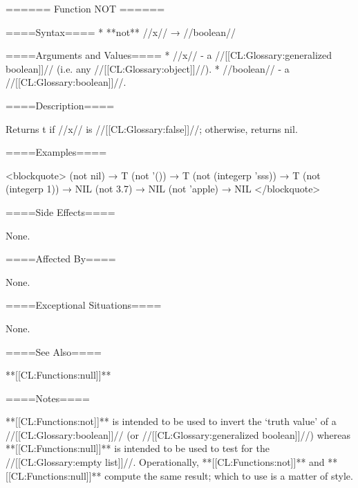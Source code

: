 ====== Function NOT ======

====Syntax====
  * **not** //x// → //boolean//

====Arguments and Values====
  * //x// - a //[[CL:Glossary:generalized boolean]]// (i.e. any //[[CL:Glossary:object]]//).
  * //boolean// - a //[[CL:Glossary:boolean]]//.

====Description====

Returns t if //x// is //[[CL:Glossary:false]]//; otherwise, returns nil.

====Examples====

<blockquote> (not nil) → T (not '()) → T (not (integerp 'sss)) → T (not (integerp 1)) → NIL (not 3.7) → NIL (not 'apple) → NIL </blockquote>

====Side Effects====

None.

====Affected By====

None.

====Exceptional Situations====

None.

====See Also====

**[[CL:Functions:null]]**

====Notes====

**[[CL:Functions:not]]** is intended to be used to invert the `truth value' of a //[[CL:Glossary:boolean]]// (or //[[CL:Glossary:generalized boolean]]//) whereas **[[CL:Functions:null]]** is intended to be used to test for the //[[CL:Glossary:empty list]]//. Operationally, **[[CL:Functions:not]]** and **[[CL:Functions:null]]** compute the same result; which to use is a matter of style.

